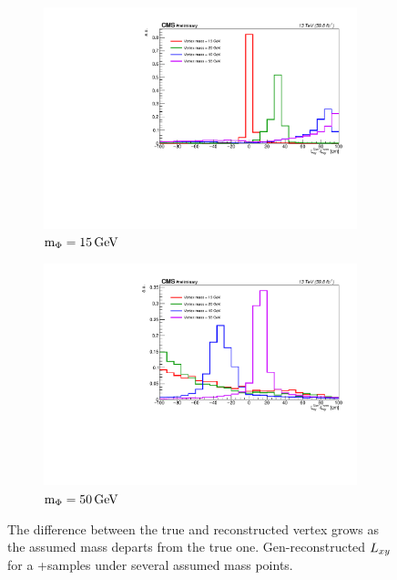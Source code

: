 \begin{figure}[htb!]
	\centering
	\captionsetup[subfigure]{justification=centering}
	\begin{subfigure}[h]{0.45\linewidth}
		\centering
		\includegraphics[width=\linewidth]{figs/05_analysis/2018_deltaLxy_Z_m15.pdf}
		\caption{$\text{m}_\Phi=15\,\text{Ge\hspace{-.08em}V}$}
	\end{subfigure}
	\begin{subfigure}[h]{0.45\linewidth}
		\centering
		\includegraphics[width=\linewidth]{figs/05_analysis/2018_deltaLxy_Z_m50.pdf}
		\caption{$\text{m}_\Phi=50\,\text{Ge\hspace{-.08em}V}$}
	\end{subfigure}
	\caption[The difference between the true and reconstructed vertex grows as the assumed mass departs from the true one. Gen-reconstructed $\lxy$ for a \PZns+\PH samples under several assumed mass points.]{The difference between the true and reconstructed vertex grows as the assumed mass departs from the true one. Gen-reconstructed $\lxy$ for a \PZns+\PH samples under several assumed mass points.}
	\label{fig:deltaLxy}
\end{figure}

